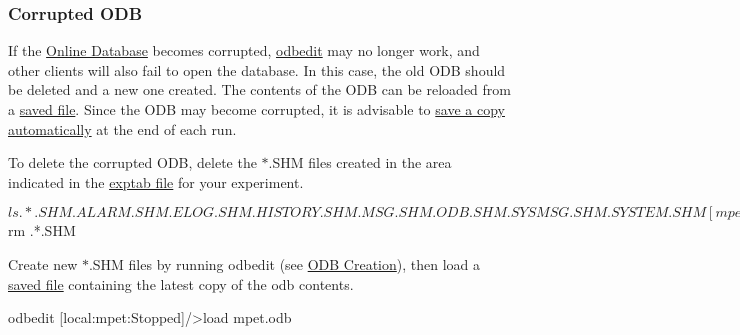 \hypertarget{RC_odbedit_examples_RC_odbedit_corrupted}{}\subsubsection{Corrupted ODB}\label{RC_odbedit_examples_RC_odbedit_corrupted}
If the \hyperlink{F_MainElements_F_Online_Database_overview}{Online Database} becomes corrupted, \hyperlink{RC_odbedit_utility}{odbedit} may no longer work, and other clients will also fail to open the database. In this case, the old ODB should be deleted and a new one created. The contents of the ODB can be reloaded from a \hyperlink{RC_odbedit_examples_RC_odbedit_save}{saved file}. Since the ODB may become corrupted, it is advisable to \hyperlink{F_Logging_Data_F_Logger_ODB_Dump}{save a copy automatically} at the end of each run. \par
 To delete the corrupted ODB, delete the $\ast$.SHM files created in the area indicated in the \hyperlink{Q_Linux_Q_Linux_Exptab}{exptab file} for your experiment. 
\begin{DoxyCode}
$ ls .*.SHM
.ALARM.SHM  .ELOG.SHM  .HISTORY.SHM  .MSG.SHM  .ODB.SHM  .SYSMSG.SHM  .SYSTEM.SHM
      
[mpet@titan01 ~/online]$ rm .*.SHM
\end{DoxyCode}
 Create new $\ast$.SHM files by running odbedit (see \hyperlink{RC_odbedit_examples_RC_odbedit_create_ODB}{ODB Creation}), then load a \hyperlink{RC_odbedit_examples_RC_odbedit_save}{saved file} containing the latest copy of the odb contents. 
\begin{DoxyCode}
 odbedit
[local:mpet:Stopped]/>load mpet.odb
\end{DoxyCode}


\par
 

 \par



